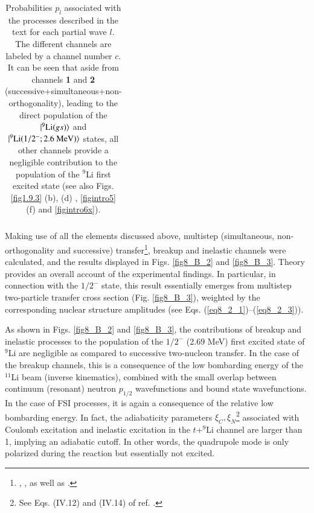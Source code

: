 \begin{table}
\begin{center}
\begin{tabular}{|c|c|c|c|c|c|}
 			\hline
 		\end{tabular}
 		\caption{Probabilities $p_l$  associated with the processes described in the text for each partial wave $l$. The different channels are labeled by a channel number $c$.  It can be seen that aside from channels \textbf{1}  and \textbf{2} (successive+simultaneous+non-orthogonality), leading to the direct population of the $|{^9\text{Li}(gs)} \rangle$ and $|{^9\text{Li}(1/2^-;2.6\text{ MeV})} \rangle$  states,  all other channels provide a negligible contribution to the population of the $^9$Li first excited state (see also Figs. \ref{fig1.9.3} (b), (d) , \ref{figintro5} (f) and \ref{figintro6x}).}\label{tab8_B_1}
 	\end{center}
 \end{table}
 
 
 Making use of all the elements discussed above, multistep (simultaneous, non-orthogonality and successive) transfer\footnote{\cite{Bayman:82}, \cite{Igarashi:91},  \cite{Bayman:73} as well as \cite{Broglia:04a}.}, breakup and inelastic channels were calculated, and the results displayed in Figs. \ref{fig8_B_2} and \ref{fig8_B_3}. Theory provides an overall account of the experimental findings. In particular, in connection with the $1/2^-$ state, this result essentially emerges from  multistep two-particle transfer cross section (Fig. \ref{fig8_B_3}), weighted by the corresponding nuclear structure amplitudes  (see Eqs. (\ref{eq8_2_1})--(\ref{eq8_2_3})). 
 
 
 As shown in Figs. \ref{fig8_B_2} and \ref{fig8_B_3}, the contributions of breakup  and inelastic  processes to the population of the $1/2^-$ (2.69 MeV) first excited state of $^9$Li are negligible as compared to successive two-nucleon transfer. In the case of the breakup channels, this is a consequence of the low bombarding energy of the $^{11}$Li beam (inverse kinematics), combined with the small overlap between continuum (resonant) neutron $p_{1/2}$ wavefunctions and  bound state wavefunctions. In the case of  FSI processes, it is again a consequence of the relative low bombarding energy. In fact, the adiabaticity parameters $\xi_C,\xi_N$\footnote{See Eqs. (IV.12) and (IV.14) of ref. \cite{Broglia:04a}.} associated with Coulomb excitation and inelastic excitation in the $t$+$^9$Li channel are larger than 1, implying an adiabatic cutoff. In other words, the quadrupole mode is  only polarized during the reaction but essentially not excited. 
 
